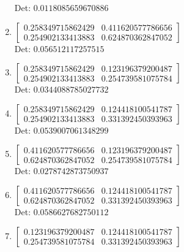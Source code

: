 \documentclass[12pt]{article}
\begin{document}
\begin{enumerate}
Det: $0.0118085659670886$\\

\item $\displaystyle \left[\begin{matrix}0.258349715862429 & 0.411620577786656\\0.254902133413883 & 0.624870362847052\end{matrix}\right]$\\

Det: $0.056512117257515$\\

\item $\displaystyle \left[\begin{matrix}0.258349715862429 & 0.123196379200487\\0.254902133413883 & 0.254739581075784\end{matrix}\right]$\\

Det: $0.0344088785027732$\\

\item $\displaystyle \left[\begin{matrix}0.258349715862429 & 0.124418100541787\\0.254902133413883 & 0.331392450393963\end{matrix}\right]$\\

Det: $0.0539007061348299$\\

\item $\displaystyle \left[\begin{matrix}0.411620577786656 & 0.123196379200487\\0.624870362847052 & 0.254739581075784\end{matrix}\right]$\\

Det: $0.0278742873750937$\\

\item $\displaystyle \left[\begin{matrix}0.411620577786656 & 0.124418100541787\\0.624870362847052 & 0.331392450393963\end{matrix}\right]$\\

Det: $0.0586627682750112$\\

\item $\displaystyle \left[\begin{matrix}0.123196379200487 & 0.124418100541787\\0.254739581075784 & 0.331392450393963\end{matrix}\right]$\\


\end{enumerate}
\end{document}
